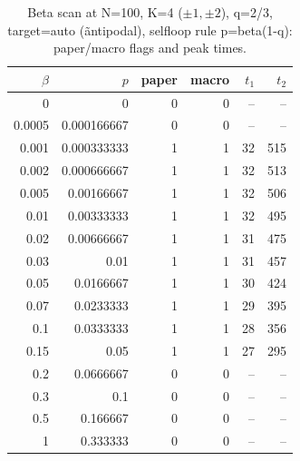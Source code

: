 \begin{table}[!htbp]
\centering
\small
\begin{tabular}{rrrrrr}
\toprule
$\beta$ & $p$ & paper & macro & $t_1$ & $t_2$\\
\midrule
0 & 0 & 0 & 0 & -- & --\\
0.0005 & 0.000166667 & 0 & 0 & -- & --\\
0.001 & 0.000333333 & 1 & 1 & 32 & 515\\
0.002 & 0.000666667 & 1 & 1 & 32 & 513\\
0.005 & 0.00166667 & 1 & 1 & 32 & 506\\
0.01 & 0.00333333 & 1 & 1 & 32 & 495\\
0.02 & 0.00666667 & 1 & 1 & 31 & 475\\
0.03 & 0.01 & 1 & 1 & 31 & 457\\
0.05 & 0.0166667 & 1 & 1 & 30 & 424\\
0.07 & 0.0233333 & 1 & 1 & 29 & 395\\
0.1 & 0.0333333 & 1 & 1 & 28 & 356\\
0.15 & 0.05 & 1 & 1 & 27 & 295\\
0.2 & 0.0666667 & 0 & 0 & -- & --\\
0.3 & 0.1 & 0 & 0 & -- & --\\
0.5 & 0.166667 & 0 & 0 & -- & --\\
1 & 0.333333 & 0 & 0 & -- & --\\
\bottomrule
\end{tabular}
\caption{Beta scan at N=100, K=4 ($\pm1,\pm2$), q=2/3, target=auto (\~antipodal), selfloop rule p=beta(1-q): paper/macro flags and peak times.}
\label{tab:beta-scan-N100-K4-en}
\end{table}
